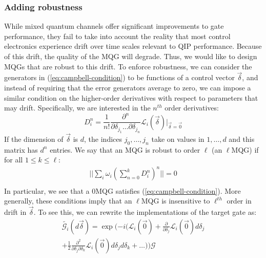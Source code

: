\documentclass[aps,nofootinbib,pra,notitlepage,twocolumn]{revtex4-1}
\begin{document}
\subsubsection{Adding robustness} %
\label{sub:adding_robustness}
While mixed quantum channels offer significant improvements to gate performance, they fail to take into account the reality that most control electronics experience drift over time scales relevant to QIP performance. Because of this drift, the quality of the MQG will degrade. Thus, we would like to design MQGs that are robust to this drift. To enforce robustness, we can consider the generators in (\ref{eq:campbell-condition}) to be functions of a control vector $\vec{\delta}$, and instead of requiring that the error generators average to zero, we can impose a similar condition on the higher-order derivatives with respect to parameters that may drift. Specifically, we are interested in the $n^{th}$ order derivatives:
\begin{equation}
\label{eq:derivative}
D^n_i = \frac{1}{n!}\frac{\partial^{n}}{\partial\delta_{j_1}\ldots\partial\delta_{j_n}}\mathcal{L}_i(\vec{\delta})|_{\vec{\delta}=\vec{0}}
\end{equation}
If the dimension of $\vec{\delta}$ is $d$, the indices $j_0, \ldots, j_n$ take on values in $1, \ldots, d$ and this matrix has $d^n$ entries. 
We say that an MQG is robust to order $\ell$ (an $\ell$MQG) if for all $1 \leq k \leq \ell$:
\begin{equation}\label{eq:MQG}
\begin{gathered}
||\sum_i\omega_i(\sum_{n=0}^k D^n_i)^n|| = 0\\
\end{gathered}
\end{equation}
In particular, we see that a 0MQG satisfies (\ref{eq:campbell-condition}). More generally, these conditions imply that an $\ell$MQG is insensitive to $\ell^{th}$ order in drift in $\vec{\delta}$. To see this, we can rewrite the implementations of the target gate as:
\begin{equation}\label{eq:taylor}
\begin{gathered}
\tilde{\mathcal{G}_i}(d\vec{\delta}) = \exp(-i(\mathcal{L}_i(\vec{0}) + \frac{\partial}{\partial\delta_j}\mathcal{L}_i(\vec{0})d\delta_j\\ +  \frac{1}{2}\frac{\partial^2}{\partial\delta_j\partial\delta_k} \mathcal{L}_i(\vec{0})d\delta_j d\delta_k + \ldots))\mathcal{G}
\end{gathered}
\end{equation}
\end{document}
